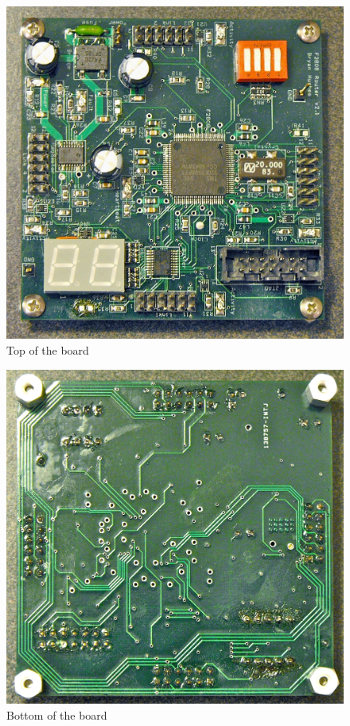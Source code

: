 \begin{appendices}
\begin{figure}[ptb]
	\begin{centering}
		\includegraphics[width=6in]{Appendices/Figures/appendices-board_top.JPG}
		\caption{Top of the board}
		\label{fig:appendices:board_top}
	\end{centering}
\end{figure}

\begin{figure}[ptb]
	\begin{centering}
		\includegraphics[width=6in]{Appendices/Figures/appendices-board_bottom.JPG}
		\caption{Bottom of the board}
		\label{fig:appendices:board_bottom}
	\end{centering}
\end{figure}


\end{appendices}
